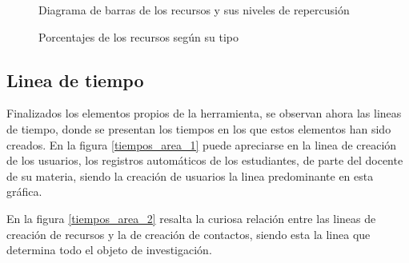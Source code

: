 \begin{figure}
\centering

\caption{Diagrama de barras de los recursos y sus niveles de repercusión}
\label{recursos_bars_1}
\end{figure}

\begin{figure}
\centering

\caption{Porcentajes de los recursos según su tipo}
\label{recursos_pie_1}
\end{figure}

\subsection{Linea de tiempo}
Finalizados los elementos propios de la herramienta, se observan ahora las
lineas de tiempo, donde se presentan los tiempos en los que estos elementos han
sido creados.
En la figura \ref{tiempos_area_1} puede apreciarse en la linea de creación de
los usuarios, los registros automáticos de los estudiantes, de parte del
docente de su materia, siendo la creación de usuarios la linea predominante en
esta gráfica.

%

En la figura \ref{tiempos_area_2} resalta la curiosa relación entre las lineas
de creación de recursos y la de creación de contactos, siendo esta la linea que
determina todo el objeto de investigación.

%


